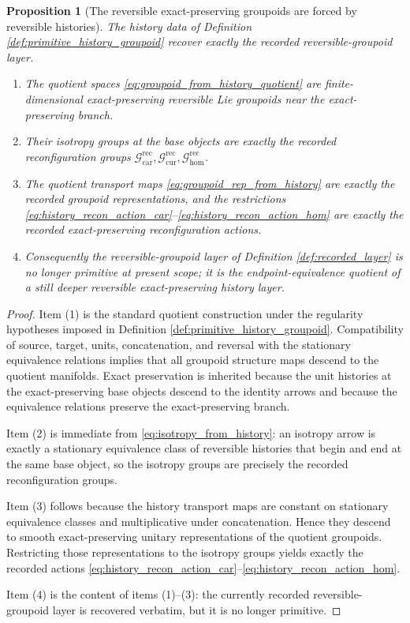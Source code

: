\documentclass[11pt]{article}
\newcommand{\TensorReconGroup}{\mathcal G_{\mathrm{car}}^{\mathrm{rec}}}
\newcommand{\CurReconGroup}{\mathcal G_{\mathrm{cur}}^{\mathrm{rec}}}
\newcommand{\HomReconGroup}{\mathcal G_{\mathrm{hom}}^{\mathrm{rec}}}
\newtheorem{proposition}{Proposition}
\begin{document}
\begin{proposition}[The reversible exact-preserving groupoids are forced by reversible histories]
\label{prop:groupoid_from_histories}
The history data of Definition \ref{def:primitive_history_groupoid} recover exactly the recorded reversible-groupoid layer.
\begin{enumerate}
    \item The quotient spaces \eqref{eq:groupoid_from_history_quotient} are finite-dimensional exact-preserving reversible Lie groupoids near the exact-preserving branch.
    \item Their isotropy groups at the base objects are exactly the recorded reconfiguration groups \(\TensorReconGroup,\CurReconGroup,\HomReconGroup\).
    \item The quotient transport maps \eqref{eq:groupoid_rep_from_history} are exactly the recorded groupoid representations, and the restrictions \eqref{eq:history_recon_action_car}--\eqref{eq:history_recon_action_hom} are exactly the recorded exact-preserving reconfiguration actions.
    \item Consequently the reversible-groupoid layer of Definition \ref{def:recorded_layer} is no longer primitive at present scope; it is the endpoint-equivalence quotient of a still deeper reversible exact-preserving history layer.
\end{enumerate}
\end{proposition}

\begin{proof}
Item (1) is the standard quotient construction under the regularity hypotheses imposed in Definition \ref{def:primitive_history_groupoid}. Compatibility of source, target, units, concatenation, and reversal with the stationary equivalence relations implies that all groupoid structure maps descend to the quotient manifolds. Exact preservation is inherited because the unit histories at the exact-preserving base objects descend to the identity arrows and because the equivalence relations preserve the exact-preserving branch.

Item (2) is immediate from \eqref{eq:isotropy_from_history}: an isotropy arrow is exactly a stationary equivalence class of reversible histories that begin and end at the same base object, so the isotropy groups are precisely the recorded reconfiguration groups.

Item (3) follows because the history transport maps are constant on stationary equivalence classes and multiplicative under concatenation. Hence they descend to smooth exact-preserving unitary representations of the quotient groupoids. Restricting those representations to the isotropy groups yields exactly the recorded actions \eqref{eq:history_recon_action_car}--\eqref{eq:history_recon_action_hom}.

Item (4) is the content of items (1)--(3): the currently recorded reversible-groupoid layer is recovered verbatim, but it is no longer primitive.
\end{proof}
\end{document}
